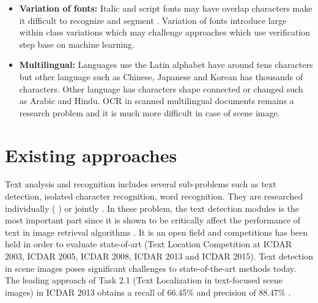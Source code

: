 \begin{itemize}
\item{\textbf{Variation of fonts: }} Italic and script fonts may have overlap characters make it difficult to recognize and segment \cite{Liu.2011.ICDAR}. Variation of fonts introduce large within class variations which may challenge approaches which use verification step base on machine learning.

\item{\textbf{Multilingual: }} Languages use the Latin alphabet have around tens characters but other language such as Chinese, Japanese and Korean has thousands of characters. Other language has characters shape connected or changed such as Arabic and Hindu. OCR in scanned multilingual documents remains a research problem \cite{Smith.2009.IWMO} and it is much more difficult in case of scene image.

\end{itemize}

\section{Existing approaches}
Text analysis and recognition includes several sub-problems such as text detection, isolated character recognition, word recognition. They are researched individually (\cite{Campos.2010.CVPR} \cite{Chen.2004.CVPR} \cite{Liu.2006.CRA} \cite{Epshtein.2010.CVPR} \cite{xucheng.2013.pami}) or jointly \cite{Neumann12}. In these problem, the text detection modules is the most important part since it is shown to be critically affect the performance of text in image retrieval algorithms \cite{Epshtein.2010.CVPR}. It is an open field and competitions has been held in order to evaluate state-of-art (Text Location Competition at ICDAR 2003, ICDAR 2005, ICDAR 2008, ICDAR 2013 and ICDAR 2015). Text detection in scene images  poses significant challenges to state-of-the-art methods today. The leading approach of Task 2.1 (Text Localization in text-focused scene images) in ICDAR 2013 obtains a recall of 66.45\% and precision of 88.47\% \cite{ICDAR.2013}. 


